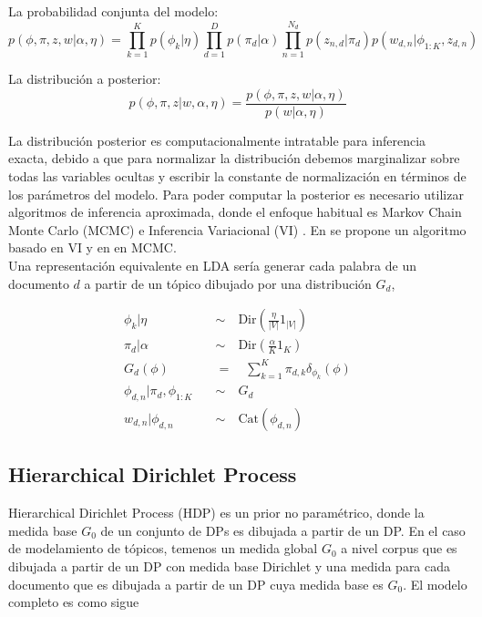 La probabilidad conjunta del modelo:
\begin{equation}
    p(\phi, \pi, z, w|\alpha, \eta)= \prod_{k=1}^{K}p(\phi_{k}|\eta)\prod_{d=1}^{D}p(\pi_{d}|\alpha)\prod_{n=1}^{N_{d}}p(z_{n,d}|\pi_{d})p(w_{d,n}|\phi_{1:K}, z_{d,n})
\end{equation}

La distribución a posterior:
\begin{equation}
    p(\phi, \pi, z|w, \alpha, \eta) = \frac{p(\phi, \pi, z, w|\alpha, \eta)}{p(w|\alpha, \eta)}
\end{equation}

La distribución posterior es computacionalmente intratable para inferencia exacta, debido a que para normalizar la distribución debemos marginalizar sobre todas las variables ocultas y escribir la constante de normalización en términos de los parámetros del modelo. Para poder computar la posterior es necesario utilizar algoritmos de inferencia aproximada, donde el enfoque habitual es Markov Chain Monte Carlo (MCMC) \citep{andrieu2003introduction} e Inferencia Variacional (VI) \citep{blei2017variational}. En \citep{blei2003latent} se propone un algoritmo basado en VI y en \citep{griffiths2004finding} en MCMC.\\

Una representación equivalente en LDA sería generar cada palabra de un documento $d$ a partir de un tópico dibujado por una distribución $G_{d}$,

\begin{align}
    \phi_{k}|\eta \quad & \sim \quad \text{Dir}(\frac{\eta}{|V|}1_{|V|})\\
    \pi_{d}|\alpha \quad & \sim \quad \text{Dir}(\frac{\alpha}{K}1_{K})\\
    G_{d}(\phi)\quad & = \quad \sum_{k=1}^{K}\pi_{d, k}\delta_{\phi_{k}}(\phi)\\
    \phi_{d,n}|\pi_{d}, \phi_{1:K} \quad & \sim \quad G_{d}\\
    w_{d,n}|\phi_{d,n} \quad & \sim \quad  \text{Cat}(\phi_{d,n})
\end{align}

\subsection{Hierarchical Dirichlet Process}
\label{sec:hdp}

Hierarchical Dirichlet Process (HDP)\citep{teh2005sharing} es un prior no paramétrico, donde la medida base $G_{0}$ de un conjunto de DPs es dibujada a partir de un DP. En el caso de modelamiento de tópicos, temenos un medida global $G_{0}$ a nivel corpus que es dibujada a partir de un DP con medida base Dirichlet y una medida para cada documento que es dibujada a partir de un DP cuya medida base es $G_{0}$. El modelo completo es como sigue


